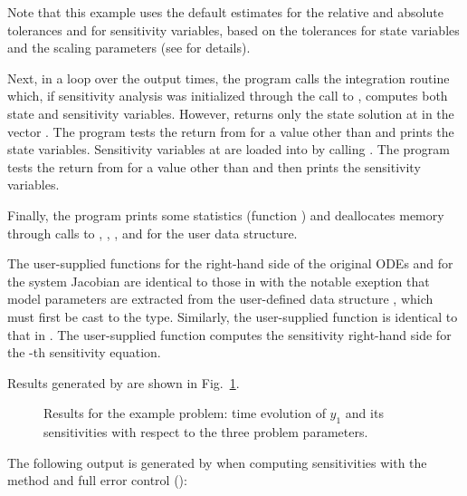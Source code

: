 Note that this example uses the default estimates for the relative and absolute tolerances 
 and  for sensitivity variables, based on the tolerances for state 
variables and the scaling parameters  (see  for details).

Next, in a loop over the  output times, the program calls the integration
routine  which, if sensitivity analysis was initialized through the call
to , computes both state and sensitivity variables. However,
 returns only the state solution at  in the vector .
The program tests the return from  for a value other than  and
prints the state variables.
Sensitivity variables at  are loaded into  by calling .
The program tests the return from  for a value other than  
and then prints the sensitivity variables.

Finally, the program prints some statistics (function ) 
and deallocates memory through calls
to , , 
, and  for the user data structure.

The user-supplied functions  for the right-hand side of the original ODEs and
 for the system Jacobian are identical to those in  with the 
notable exeption that model parameters are extracted from the user-defined data structure
, which must first be cast to the  type. Similarly, the
user-supplied function  is identical to that in .
The user-supplied function  computes the sensitivity right-hand side for the -th 
sensitivity equation.

Results generated by  are shown in Fig.~\ref{f:cvsRoberts_FSA_dns}. 
\begin{figure}
  {\centerline{}}
  \caption{Results for the  example problem:
    time evolution of $y_1$ and its sensitivities with respect to the
    three problem parameters.}
  \label{f:cvsRoberts_FSA_dns}
\end{figure}
The following output is generated by  when computing
sensitivities with the  method and full error
control ():



